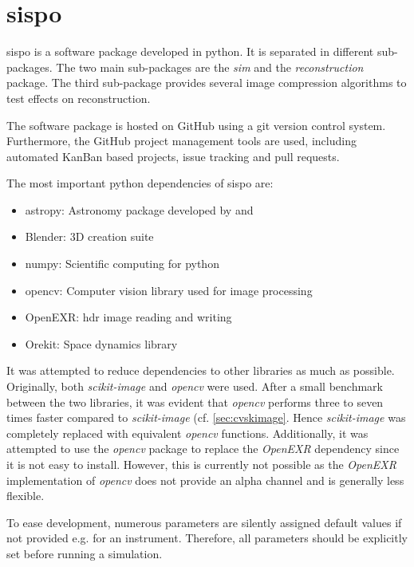 \section{\Acrlong{sispo}} \label{sec:sispo}

\gls{sispo} is a software package developed in python. It is separated in different sub-packages. The two main sub-packages are the \textit{sim} and the \textit{reconstruction} package. The third sub-package provides several image compression algorithms to test effects on reconstruction.

The software package is hosted on GitHub using a git version control system. Furthermore, the GitHub project management tools are used, including automated KanBan based projects, issue tracking and pull requests.

The most important python dependencies of \gls{sispo} are:
\begin{itemize}
    \item astropy: Astronomy package developed by \cite{robitaille2013astropy} and \cite{price2018astropy}
    \item Blender: 3D creation suite
    \item numpy: Scientific computing for python
    \item opencv: Computer vision library used for image processing
    \item OpenEXR: \gls{hdr} image reading and writing
    \item Orekit: Space dynamics library
\end{itemize}

It was attempted to reduce dependencies to other libraries as much as possible. Originally, both \textit{scikit-image} and \textit{opencv} were used. After a small benchmark between the two libraries, it was evident that \textit{opencv} performs three to seven times faster compared to \textit{scikit-image} (cf. \ref{sec:cvskimage}. Hence \textit{scikit-image} was completely replaced with equivalent \textit{opencv} functions. Additionally, it was attempted to use the \textit{opencv} package to replace the \textit{OpenEXR} dependency since it is not easy to install. However, this is currently not possible as the \textit{OpenEXR} implementation of \textit{opencv} does not provide an alpha channel and is generally less flexible.

To ease development, numerous parameters are silently assigned default values if not provided e.g. for an instrument. Therefore, all parameters should be explicitly set before running a simulation.


